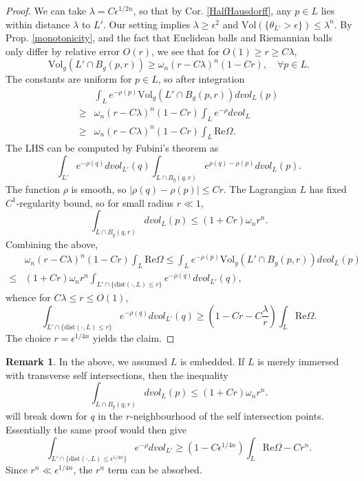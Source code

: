 \documentclass[a4paper]{article}
\theoremstyle{definition}
\newtheorem{rmk}{Remark}
\begin{document}
\begin{proof}
We can take $\lambda=C\epsilon^{1/2n}$, so that by Cor. \ref{HalfHausdorff}, any $p\in L$ lies within distance $\lambda$ to $L'$. Our setting implies $\lambda\geq \epsilon^2$ and $\text{Vol}(\{\theta_{L'}>\epsilon  \})\leq \lambda^n$. By Prop. \ref{monotonicity}, and the fact that Euclidean balls and Riemannian balls only differ by relative error $O(r)$, we see that for $O(1)\geq r\geq C\lambda$, 
\[
\text{Vol}_g (L'\cap B_g(p,r)) \geq \omega_n (r-C\lambda)^n (1-Cr),\quad \forall p\in L.
\]
The constants are uniform for $p\in L$, so after integration
\[
\begin{split}
& \int_L e^{-\rho(p)}\text{Vol}_g (L'\cap B_g(p,r)) dvol_L(p) 
\\
\geq  & \omega_n (r-C\lambda)^n (1-Cr)\int_L e^{-\rho}dvol_L 
\\
\geq & \omega_n (r-C\lambda)^n (1-Cr)\int_L \text{Re}\Omega.
\end{split}
\]
The LHS can be computed by Fubini's theorem as
\[
\int_{L'} e^{-\rho(q)}dvol_{L'}(q) \int_{L\cap B_g(q,r)} e^{\rho(q)-\rho(p)} dvol_L(p).
\]
The function $\rho$ is smooth, so $|\rho(q)-\rho(p)|\leq Cr$. The Lagrangian $L$ has fixed $C^1$-regularity bound, so for small radius $r\ll 1$,
\[
\int_{L\cap B_g(q,r)} dvol_L(p)\leq (1+Cr) \omega_n r^n.
\]
Combining the above,
\[
\begin{split}
& \omega_n (r-C\lambda)^n (1-Cr)\int_L \text{Re}\Omega\leq \int_L e^{-\rho(p)}\text{Vol}_g (L'\cap B_g(p,r)) dvol_L(p) 
\\
\leq & (1+Cr) \omega_n r^n \int_{L'\cap \{   \text{dist}(\cdot, L)\leq r \} } e^{-\rho(q)}dvol_{L'}(q),
\end{split}
\]
whence for $C\lambda\leq r\leq O(1)$,
\begin{equation}\label{distanceweakL1}
\int_{L'\cap \{   \text{dist}(\cdot, L)\leq r \} } e^{-\rho(q)}dvol_{L'}(q) \geq (1- Cr- C\frac{\lambda}{r}) \int_L \text{Re}\Omega. 
\end{equation}
The choice $r= \epsilon^{1/4n}$ yields the claim.
\end{proof}






\begin{rmk}
In the above, we assumed $L$ is embedded.
If $L$ is merely immersed with transverse self intersections, then the inequality \[
\int_{L\cap B_g(q,r)} dvol_L(p)\leq (1+Cr) \omega_n r^n.
\]
will break down for $q$ in the $r$-neighbourhood of the self intersection points. Essentially the same proof would then give
\[
\int_{L'\cap \{   \text{dist}(\cdot, L)\leq \epsilon^{1/4n} \} } e^{-\rho}dvol_{L'} \geq (1- C\epsilon^{1/{4n}}) \int_L \text{Re}\Omega -Cr^n.
\]
Since $r^n\ll \epsilon^{1/4n}$, the $r^n$ term can be absorbed. 


\end{rmk}
\end{document}
